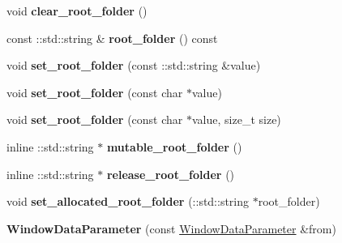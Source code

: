\begin{DoxyCompactItemize}
void {\bfseries clear\+\_\+root\+\_\+folder} ()
\item 
\mbox{\label{classcaffe_1_1_window_data_parameter_a302f82f85e71b979a8f88cd4d34df5d5}} 
const \+::std\+::string \& {\bfseries root\+\_\+folder} () const
\item 
\mbox{\label{classcaffe_1_1_window_data_parameter_aa18a738ff0dcbb200defb25f5e430369}} 
void {\bfseries set\+\_\+root\+\_\+folder} (const \+::std\+::string \&value)
\item 
\mbox{\label{classcaffe_1_1_window_data_parameter_a23f3d5cce40226ad2f66271dc67d7b4b}} 
void {\bfseries set\+\_\+root\+\_\+folder} (const char $\ast$value)
\item 
\mbox{\label{classcaffe_1_1_window_data_parameter_a5ebbdb9bf66ce6044cef1834176d68c6}} 
void {\bfseries set\+\_\+root\+\_\+folder} (const char $\ast$value, size\+\_\+t size)
\item 
\mbox{\label{classcaffe_1_1_window_data_parameter_aa9d50e20b02418cefcfd93c4c21f2fdd}} 
inline \+::std\+::string $\ast$ {\bfseries mutable\+\_\+root\+\_\+folder} ()
\item 
\mbox{\label{classcaffe_1_1_window_data_parameter_a0f41dc7ba4be195248df4334bfc92e87}} 
inline \+::std\+::string $\ast$ {\bfseries release\+\_\+root\+\_\+folder} ()
\item 
\mbox{\label{classcaffe_1_1_window_data_parameter_a55841a01ec03475588a371265c5e0f0a}} 
void {\bfseries set\+\_\+allocated\+\_\+root\+\_\+folder} (\+::std\+::string $\ast$root\+\_\+folder)
\item 
\mbox{\label{classcaffe_1_1_window_data_parameter_a5fdff1c7d6926e203823ee75a5dad8aa}} 
{\bfseries Window\+Data\+Parameter} (const \mbox{\hyperlink{classcaffe_1_1_window_data_parameter}{Window\+Data\+Parameter}} \&from)
\item 
\mbox{\label{classcaffe_1_1_window_data_parameter_ac6f421a04b00468a864674a835cd31b9}} 

\end{DoxyCompactItemize}
